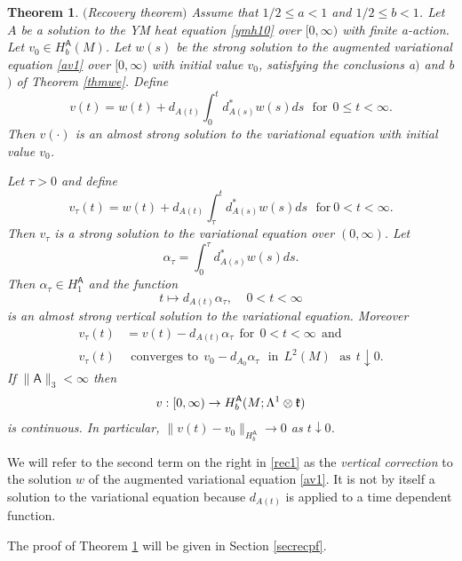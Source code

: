 \documentclass[12pt]{article}
\newtheorem{theorem}{Theorem}[section]
\def \L{\Lambda}
\def \As{\mathsf{A}}
\def \kf{\frak k}
\def \beq{\begin{equation}}
\def \eeq{\end{equation}}
\def \eref{\eqref}
\numberwithin{equation}{section}
\begin{document}
 \begin{theorem}\label{thmrec1} $($Recovery theorem$)$ 
Assume that  $1/2 \le a < 1$ and $1/2\le b <1$. 
 Let $A$ be a solution to the YM heat equation \eref{ymh10}  over $[0, \infty)$ with finite a-action. 
 Let $v_0 \in H_{b}^\As(M)$.
 Let $w(s)$ be the strong solution to the augmented variational equation \eref{av1} 
 over $[0,\infty)$ with  initial value $v_0$, satisfying the conclusions a$)$ and b$)$ of Theorem \ref{thmwe}. 
 Define 
 \beq
  v(t) = w(t) + d_{A(t)}  \int_0^t d_{A(s)}^* w(s) ds \ \ \ \text{for}\ \ 0\le  t <  \infty.    
            \label{rec1}
\eeq
Then $v(\cdot)$ is an almost strong solution to the variational equation with initial value $v_0$.

Let $\tau >0$ 
and define
\beq
v_\tau(t)     
 =  w(t) + d_{A(t)}  \int_\tau^t d_{A(s)}^* w(s) ds \ \ \ \text{for}\ 0 < t <  \infty. 
                       \label{rec2}
\eeq 
Then $v_\tau$ 
 is a strong solution to the variational equation over $(0, \infty)$. 
  Let
\beq
\alpha_\tau = \int_0^\tau   d_{A(s)}^* w(s) ds.                                                          \label{rec3}
\eeq
Then $\alpha_\tau \in H_{1}^\As$ and the function 
\beq
t\mapsto d_{A(t)} \alpha_\tau, \ \ \  \ \ 0< t <  \infty          
            \label{rec4}
\eeq
is an almost strong  vertical solution to the variational equation. 
Moreover
\begin{align}
 v_\tau(t)   
 &= v(t) -   d_{A(t)} \alpha_\tau \ \  \text{for}\ \  0 < t<  \infty 
 \ \ \text{and}     \label{rec5} \\
 v_\tau(t) 
 &\ \ \text{converges to} 
 \ \ v_0 - d_{A_0} \alpha_\tau \ \ \  \text{in}\ \ L^2(M)\ \ \ \text{as} \ \ t\downarrow 0. \label{rec6}
\end{align}
 If  $\| \As\|_3 < \infty$  
 then
\begin{align}
v: [0,  \infty)  \rightarrow H_b^\As(M; \L^1\otimes \kf)                     \label{rec1.1}
\end{align}
is continuous.  In particular, $\|v(t) - v_0\|_{H_b^\As} \rightarrow 0$ as $ t\downarrow 0$.
\end{theorem}

We will refer to the  second term on the right in \eref{rec1} as  the {\it vertical correction}
 to the solution $w$ of the augmented variational equation \eref{av1}. It is not by itself a solution to the
 variational equation because $d_{A(t)}$ is  applied to a time dependent function.

The proof of Theorem \ref{thmrec1} will be given in Section \ref{secrecpf}.
\end{document}
